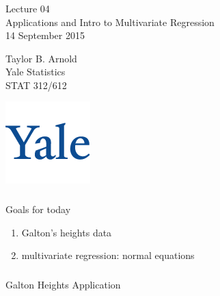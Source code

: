 



\begin{frame}[fragile] \frametitle{}

\vfill

{\fontsize{0.7cm}{0cm}\selectfont Lecture 04 \\\vspace{0.2cm} Applications
and Intro to Multivariate Regression}\\\vspace{0.5cm}
14 September 2015

\vspace{2cm}

\begin{minipage}{0.6\textwidth}
Taylor B. Arnold \\
Yale Statistics \\
STAT 312/612
\end{minipage}
\hfill
\begin{minipage}{0.3\textwidth}\raggedleft
\includegraphics[scale=0.3]{../yale-logo.png}
\end{minipage}%

\end{frame}

\begin{frame}[fragile] \frametitle{}

{\color{yaleblue}\fontsize{16pt}{20pt}\selectfont Goals for today}

\begin{enumerate}
\item Galton's heights data
\item multivariate regression: normal equations
\end{enumerate}

\end{frame}

\begin{frame}[fragile] \frametitle{}

\begin{flushright}
{\color{yaleblue}\sc\fontsize{1cm}{0cm}\selectfont Galton Heights Application}
\end{flushright}

\end{frame}

